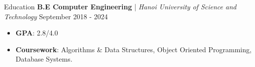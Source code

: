\begin{rSection}{Education}
    \textbf{B.E Computer Engineering} | \textit{ Hanoi University of Science and Technology } \hfill {September 2018 - 2024}
    \begin{itemize}
        \itemsep 0pt {} \vspace{0.5em}
        \item \textbf{GPA}: 2.8/4.0
        \item \textbf{Coursework}: Algorithms \& Data Structures, Object Oriented Programming, Database Systems.
    \end{itemize}
\end{rSection}